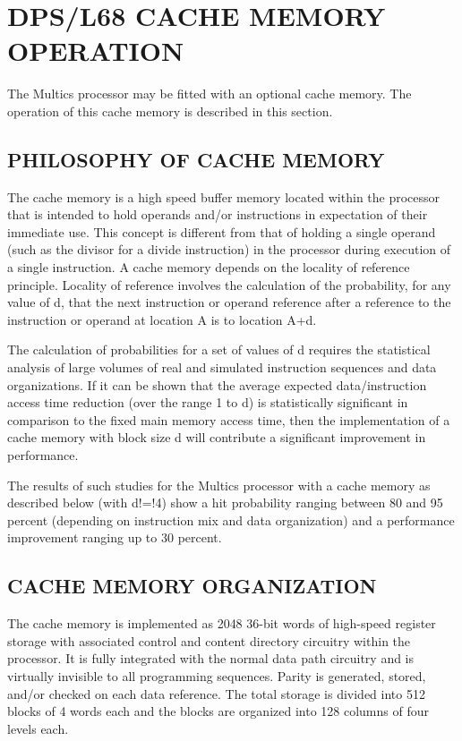 
\section{DPS/L68 CACHE MEMORY OPERATION}


The Multics processor may be fitted with an optional cache memory. The
operation of this cache memory is described in this section.


\subsection{PHILOSOPHY OF CACHE MEMORY}

The cache memory is a high speed buffer memory located within the processor
that is intended to hold operands and/or instructions in expectation of their
immediate use. This concept is different from that of holding a single operand
(such as the divisor for a divide instruction) in the processor during
execution of a single instruction. A cache memory depends on the locality of
reference principle. Locality of reference involves the calculation of the
probability, for any value of d, that the next instruction or operand reference
after a reference to the instruction or operand at location A is to location
A+d.

The calculation of probabilities for a set of values of d requires the
statistical analysis of large volumes of real and simulated instruction
sequences and data organizations. If it can be shown that the average expected
data/instruction access time reduction (over the range 1 to d) is statistically
significant in comparison to the fixed main memory access time, then the
implementation of a cache memory with block size d will contribute a
significant improvement in performance.

The results of such studies for the Multics processor with a cache memory as
described below (with d!=!4) show a hit probability ranging between 80 and 95
percent (depending on instruction mix and data organization) and a performance
improvement ranging up to 30 percent.  


\subsection{CACHE MEMORY ORGANIZATION} 

The cache memory is implemented as 2048 36-bit words of high-speed register
storage with associated control and content directory circuitry within the
processor. It is fully integrated with the normal data path circuitry and is
virtually invisible to all programming sequences. Parity is generated, stored,
and/or checked on each data reference. The total storage is divided into 512
blocks of 4 words each and the blocks are organized into 128 columns of four
levels each.

